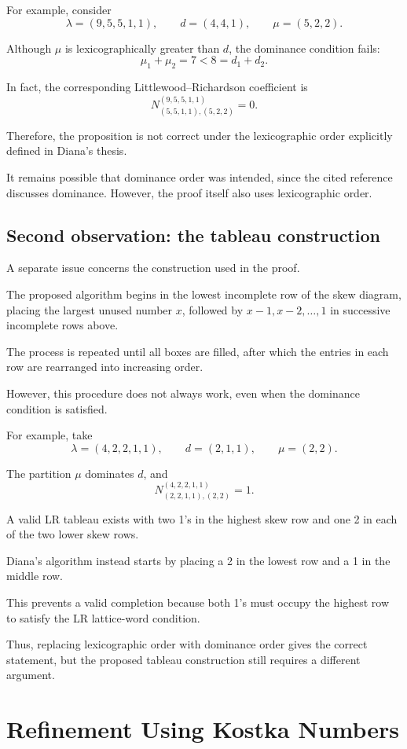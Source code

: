 \documentclass[11pt,a4paper]{article}
\begin{document}
For example, consider
\[
\lambda=(9,5,5,1,1),\qquad
d=(4,4,1),\qquad
\mu=(5,2,2).
\]

Although $\mu$ is lexicographically greater
than $d$, the dominance condition fails:
\[
\mu_1+\mu_2=7<8=d_1+d_2.
\]

In fact, the corresponding Littlewood--Richardson
coefficient is
\[
N^{(9,5,5,1,1)}_{(5,5,1,1),(5,2,2)}=0.
\]

Therefore, the proposition is not correct under
the lexicographic order explicitly defined
in Diana's thesis.

It remains possible that dominance order was
intended, since the cited reference discusses
dominance. However, the proof itself also
uses lexicographic order.

\subsection*{Second observation: the tableau construction}

A separate issue concerns the construction used
in the proof.

The proposed algorithm begins in the lowest
incomplete row of the skew diagram, placing
the largest unused number $x$, followed by
$x-1,x-2,\ldots,1$ in successive incomplete
rows above.

The process is repeated until all boxes are
filled, after which the entries in each row
are rearranged into increasing order.

However, this procedure does not always work,
even when the dominance condition is satisfied.

For example, take
\[
\lambda=(4,2,2,1,1),\qquad
d=(2,1,1),\qquad
\mu=(2,2).
\]

The partition $\mu$ dominates $d$, and
\[
N^{(4,2,2,1,1)}_{(2,2,1,1),(2,2)}=1.
\]

A valid LR tableau exists with two 1's in the
highest skew row and one 2 in each of the
two lower skew rows.

Diana's algorithm instead starts by placing
a 2 in the lowest row and a 1 in the middle row.

This prevents a valid completion because
both 1's must occupy the highest row to
satisfy the LR lattice-word condition.

Thus, replacing lexicographic order with
dominance order gives the correct statement,
but the proposed tableau construction still
requires a different argument.

\section{Refinement Using Kostka Numbers}
\end{document}
